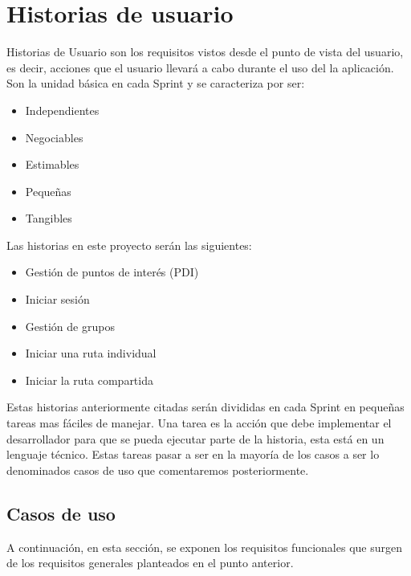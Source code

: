 \section{Historias de usuario}
Historias de Usuario son los requisitos vistos desde el punto de vista del usuario, es decir, acciones que el usuario llevará a cabo durante el uso del la aplicación. Son la unidad básica en cada Sprint y se caracteriza por ser:
\begin{itemize}
\item Independientes
 \item Negociables
  \item Estimables
  \item Pequeñas
   \item Tangibles
    
\end{itemize}

Las historias en este proyecto serán las siguientes:


\begin{itemize}
 \item Gestión de puntos de interés (PDI)
\item Iniciar sesión  
  \item Gestión de grupos
  \item Iniciar una ruta individual
   \item Iniciar la ruta compartida
    
\end{itemize}
 Estas historias anteriormente citadas serán divididas en cada Sprint en pequeñas tareas mas fáciles de manejar. Una tarea es la acción que debe implementar el desarrollador para que se pueda ejecutar parte de la historia, esta está en un lenguaje técnico. Estas tareas pasar a ser en la mayoría de los casos a ser lo denominados casos de uso que comentaremos posteriormente.

\subsection{Casos de uso}
A continuación, en esta sección, se exponen los requisitos funcionales que surgen de los requisitos generales planteados en el punto anterior.
